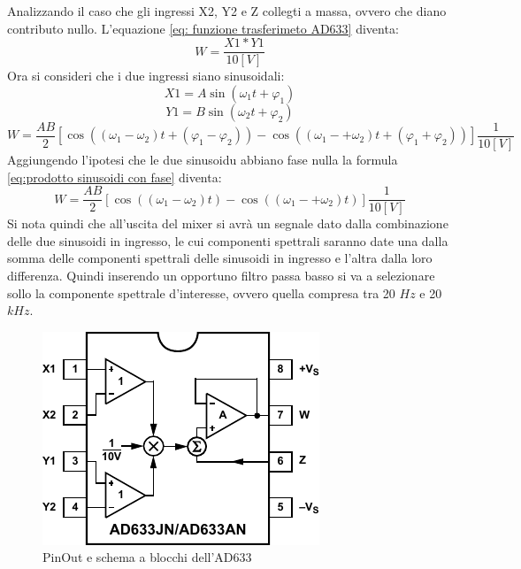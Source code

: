 \documentclass[titlepage]{report}
\begin{document}
	\noindent Analizzando il caso che gli ingressi X2, Y2 e Z collegti a massa, ovvero che diano contributo nullo. L'equazione \ref*{eq: funzione trasferimeto AD633} diventa:
	\begin{equation}
		\label{eq: prodotto sinusoidi AD633}
		W = \frac{X1 * Y1}{10 [V]}
	\end{equation}
	Ora si consideri che i due ingressi siano sinusoidali:
	\begin{equation}
		\label{eq: X1 sinusoidale}
		X1 = A\sin (\omega _1t + \varphi _1)
	\end{equation}
	\begin{equation}
		\label{eq: XY sinusoidale}
		Y1 = B\sin (\omega _2t + \varphi _2)
	\end{equation}
	\begin{equation}
		\label{eq:prodotto sinusoidi con fase}
		W = \frac{AB}{2}[\cos ((\omega _1 - \omega _2)t + (\varphi _1 - \varphi _2)) - \cos ((\omega _1 -+\omega _2)t + (\varphi _1 + \varphi _2))]\frac{1}{10[V]}
	\end{equation}
	Aggiungendo l'ipotesi che le due sinusoidu abbiano fase nulla la formula \ref*{eq:prodotto sinusoidi con fase} diventa:
	\begin{equation}
		\label{eq:prodotto sinusoidi}
		W = \frac{AB}{2}[\cos ((\omega _1 - \omega _2)t) - \cos ((\omega _1 -+\omega _2)t)]\frac{1}{10[V]} 
	\end{equation}
	Si nota quindi che all'uscita del mixer si avrà un segnale dato dalla combinazione delle due sinusoidi in ingresso, le cui componenti spettrali saranno date una dalla somma delle componenti spettrali delle sinusoidi in ingresso e l'altra dalla loro differenza.
	Quindi inserendo un opportuno filtro passa basso si va a selezionare sollo la componente spettrale d'interesse, ovvero quella compresa tra 20 $Hz$ e 20 $kHz$.

	\begin{figure}[h]
		\centering
		\includegraphics{Immagini/ad633_pinout.pdf}
		\caption{PinOut e schema a blocchi dell'AD633}
		\label{fig: AD633 schema a blocchi}
	\end{figure}
\end{document}
